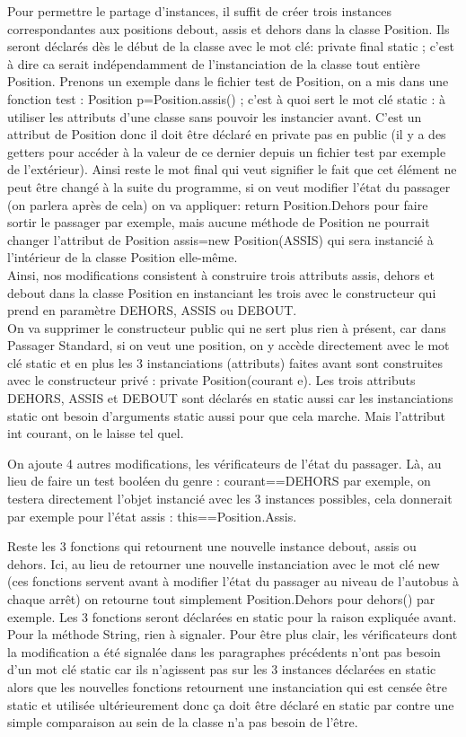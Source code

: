 \documentclass{article}
\begin{document}
Pour permettre le partage d’instances, il suffit de créer trois instances correspondantes aux positions debout, assis et dehors dans la classe Position. Ils seront déclarés dès le début de la classe avec le mot clé: private final static ; c’est à dire ca serait indépendamment de l’instanciation de la classe tout entière Position. Prenons un exemple dans le fichier test de Position, on a mis dans une fonction test : Position p=Position.assis() ; c’est à quoi sert le mot clé static : à utiliser les attributs d’une classe sans pouvoir les instancier avant. C’est un attribut de Position donc il doit être déclaré en private pas en public (il y a des getters pour accéder à la valeur de ce dernier depuis un fichier test par exemple de l'extérieur). Ainsi reste le mot final qui veut signifier le fait que cet élément ne peut être changé à la suite du programme, si on veut modifier l’état du passager (on parlera après de cela) on va appliquer: return Position.Dehors pour faire sortir le passager par exemple, mais aucune méthode de Position ne pourrait changer l’attribut de Position assis=new Position(ASSIS) qui sera instancié à l'intérieur de la classe Position elle-même.\\
Ainsi, nos modifications consistent à construire trois attributs assis, dehors et debout dans la classe Position en instanciant les trois avec le constructeur qui prend en paramètre DEHORS, ASSIS ou DEBOUT.\\

On va supprimer le constructeur public qui ne sert plus rien à présent, car dans Passager
Standard, si on veut une position, on y accède directement avec le mot clé static et en plus les 3 instanciations (attributs) faites avant sont construites avec le constructeur privé : private Position(courant e). Les trois attributs DEHORS, ASSIS et DEBOUT sont déclarés en static aussi car les instanciations static ont besoin d’arguments static aussi pour que cela marche. Mais l’attribut int courant, on le laisse tel quel.

On ajoute 4 autres modifications, les vérificateurs de l’état du passager. Là, au lieu de faire un test booléen du genre : courant==DEHORS par exemple, on testera directement l’objet instancié avec les 3 instances possibles, cela donnerait par exemple pour l’état assis : this==Position.Assis.

Reste les 3 fonctions qui retournent une nouvelle instance debout, assis ou dehors. Ici, au lieu de retourner une nouvelle instanciation avec le mot clé new (ces fonctions servent avant à modifier l’état du passager au niveau de l’autobus à chaque arrêt) on retourne tout simplement Position.Dehors pour dehors() par exemple. Les 3 fonctions seront déclarées en static pour la raison expliquée avant. Pour la méthode String, rien à signaler. Pour être plus clair, les vérificateurs dont la modification a été signalée dans les paragraphes précédents n’ont pas besoin d’un mot clé static car ils n’agissent pas sur les 3 instances déclarées en static alors que les nouvelles fonctions retournent une instanciation qui est censée être static et utilisée ultérieurement donc ça doit être déclaré en static par contre une simple comparaison au sein de la classe n’a pas besoin de l’être.\\
\end{document}
